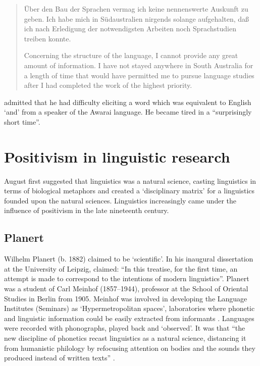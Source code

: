\documentclass[output=paper]{langsci/langscibook}
\begin{document}
\begin{quote}
    Über den Bau der Sprachen vermag ich keine nennenswerte Auskunft zu geben. Ich habe mich in Südaustralien nirgends solange aufgehalten, daß ich nach Erledigung der notwendigsten Arbeiten noch Sprachstudien treiben konnte. 

    Concerning the structure of the language, I cannot provide any great amount of information. I have not stayed anywhere in South Australia for a length of time that would have permitted me to pursue language studies after I had completed the work of the highest priority. \citep[81]{eylmann_eingeborenen_1908}
\end{quote}

\citet[81]{eylmann_eingeborenen_1908} admitted that he had difficulty eliciting a word which was equivalent to English ‘and’ from a speaker of the Awarai language. He became tired in a ``surprisingly short time''.

\section{Positivism in linguistic research}

August \citet{schleicher_sprachen_1983}  first suggested that linguistics was a natural science, casting linguistics in terms of biological metaphors and created a ‘disciplinary matrix’ for a linguistics founded upon the natural sciences. Linguistics increasingly came under the influence of positivism in the late nineteenth century.

\subsection{Planert}

Wilhelm Planert (b. 1882) claimed to be ‘scientific’. In his inaugural dissertation at the University of Leipzig, \citet{planert_syntaktischen_1907} claimed: “In this treatise, for the first time, an attempt is made to correspond to the intentions of modern linguistics”. Planert was a student of Carl Meinhof (1857--1944), professor at the School of Oriental Studies in Berlin from 1905. Meinhof was involved in developing the Language Institutes (Seminars) as ‘Hypermetropolitan spaces’, laboratories where phonetic and linguistic information could be easily extracted from informants \citep[138]{pugach_africa_2012}. Languages were recorded with phonographs, played back and ‘observed’. It was that “the new discipline of phonetics recast linguistics as a natural science, distancing it from humanistic philology by refocusing attention on bodies and the sounds they produced instead of written texts” \citep[93]{pugach_africa_2012}. 
\end{document}

